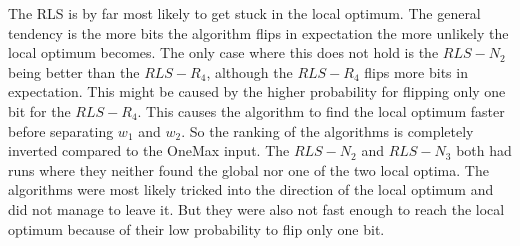 The RLS is by far most likely to get stuck in the local optimum.
The general tendency is the more bits the algorithm flips in expectation the more unlikely the local optimum becomes.
The only case where this does not hold is the $RLS-N_2$ being better than the $RLS-R_4$, although the $RLS-R_4$ flips more bits in expectation.
This might be caused by the higher probability for flipping only one bit for the $RLS-R_4$.
This causes the algorithm to find the local optimum faster before separating $w_1$ and $w_2$.
So the ranking of the algorithms is completely inverted compared to the OneMax input.
The $RLS-N_2$ and $RLS-N_3$ both had runs where they neither found the global nor one of the two local optima.
The algorithms were most likely tricked into the direction of the local optimum and did not manage to leave it.
But they were also not fast enough to reach the local optimum because of their low probability to flip only one bit.